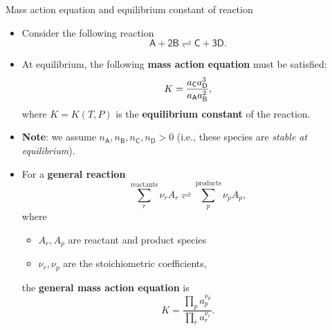 \begin{frame}{Mass action equation and equilibrium constant of reaction}

\lcol
\begin{itemize}
\item Consider the following reaction
\[
\mathsf{A+2B\rightleftharpoons C+3D}.
\]
\item At equilibrium, the following \alert{\textbf{mass action equation}} must be
satisfied:
\[
K=\frac{a_{\sf C}a_{\sf D}^{3}}{a_{\sf A}a_{\sf B}^{2}},
\]
where $K=K(T,P)$ is the \alert{\textbf{equilibrium constant}} of the reaction.
\item \textbf{Note}: we assume $n_{\mathsf{A}},n_{\mathsf{B}},n_{\mathsf{C}},n_{\mathsf{D}}>0$
(i.e., these species are \emph{stable at equilibrium}).

\end{itemize}
\rcol
\begin{itemize}
\item For a \textbf{general reaction}
\[
\sum_{r}^{\text{reactants}}\nu_{r}A_{r}\rightleftharpoons\sum_{p}^{\text{products}}\nu_{p}A_{p},
\]
where 
\begin{itemize}
\item $A_{r}, A_p$ are reactant and product species
\item $\nu_{r}, \nu_{p}$ are the stoichiometric coefficients,
\end{itemize}
%
the \alert{\textbf{general mass action equation}} is
\[
K=\dfrac{\prod_{p}a_{p}^{\nu_{p}}}{\prod_{r}a_{r}^{\nu_{r}}}.
\]
\end{itemize}
\ecol
\end{frame}
%
